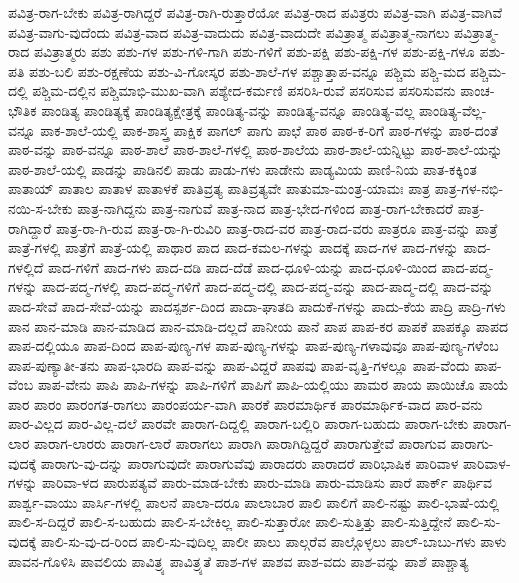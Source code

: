 {ಪವಿತ್ರ-ರಾಗ-ಬೇಕು
ಪವಿತ್ರ-ರಾಗಿದ್ದರೆ
ಪವಿತ್ರ-ರಾಗಿ-ರುತ್ತಾರೆಯೋ
ಪವಿತ್ರ-ರಾದ
ಪವಿತ್ರರು
ಪವಿತ್ರ-ವಾಗಿ
ಪವಿತ್ರ-ವಾಗಿವೆ
ಪವಿತ್ರ-ವಾಗು-ವುದೆಂದು
ಪವಿತ್ರ-ವಾದ
ಪವಿತ್ರ-ವಾದುದು
ಪವಿತ್ರ-ವಾದುದೇ
ಪವಿತ್ರಾತ್ಮ
ಪವಿತ್ರಾತ್ಮ-ನಾಗಲು
ಪವಿತ್ರಾತ್ಮ-ರಾದ
ಪವಿತ್ರಾತ್ಮರು
ಪಶು
ಪಶು-ಗಳ
ಪಶು-ಗಳಿ-ಗಾಗಿ
ಪಶು-ಗಳಿಗೆ
ಪಶು-ಪಕ್ಷಿ
ಪಶು-ಪಕ್ಷಿ-ಗಳ
ಪಶು-ಪಕ್ಷಿ-ಗಳೂ
ಪಶು-ಪತಿ
ಪಶು-ಬಲಿ
ಪಶು-ರಕ್ಷಣೆಯ
ಪಶು-ವಿ-ಗೋಸ್ಕರ
ಪಶು-ಶಾಲೆ-ಗಳ
ಪಶ್ಚಾತ್ತಾಪ-ವನ್ನೂ
ಪಶ್ಚಿಮ
ಪಶ್ಚಿ-ಮದ
ಪಶ್ಚಿಮ-ದಲ್ಲಿ
ಪಶ್ಚಿಮ-ದಲ್ಲಿನ
ಪಶ್ಚಿಮಾಭಿ-ಮುಖ-ವಾಗಿ
ಪಶ್ಯೇದ-ಕರ್ಮಣಿ
ಪಸರಿಸಿ-ರುವೆ
ಪಸರಿಸುವ
ಪಸರಿಸುವನು
ಪಾಂಚ-ಭೌತಿಕ
ಪಾಂಡಿತ್ಯ
ಪಾಂಡಿತ್ಯಕ್ಕೆ
ಪಾಂಡಿತ್ಯಕ್ಷೇತ್ರಕ್ಕೆ
ಪಾಂಡಿತ್ಯ-ವನ್ನು
ಪಾಂಡಿತ್ಯ-ವನ್ನೂ
ಪಾಂಡಿತ್ಯ-ವಲ್ಲ
ಪಾಂಡಿತ್ಯ-ವೆಲ್ಲ-ವನ್ನೂ
ಪಾಕ-ಶಾಲೆ-ಯಲ್ಲಿ
ಪಾಕ-ಶಾಸ್ತ್ರ
ಪಾಕ್ಷಿಕ
ಪಾಗಲ್
ಪಾಗು
ಪಾಛೆ
ಪಾಠ
ಪಾಠ-ಕ-ರಿಗೆ
ಪಾಠ-ಗಳನ್ನು
ಪಾಠ-ದಂತೆ
ಪಾಠ-ವನ್ನು
ಪಾಠ-ವನ್ನೂ
ಪಾಠ-ಶಾಲೆ
ಪಾಠ-ಶಾಲೆ-ಗಳಲ್ಲಿ
ಪಾಠ-ಶಾಲೆಯ
ಪಾಠ-ಶಾಲೆ-ಯನ್ನಿಟ್ಟು
ಪಾಠ-ಶಾಲೆ-ಯನ್ನು
ಪಾಠ-ಶಾಲೆ-ಯಲ್ಲಿ
ಪಾಡನ್ನು
ಪಾಡಿನಲಿ
ಪಾಡು
ಪಾಡು-ಗಳು
ಪಾಡೇನು
ಪಾಡ್ಯಮಿಯ
ಪಾಣಿ-ನಿಯ
ಪಾತ-ಕಕ್ಕಿಂತ
ಪಾತಾಯ್
ಪಾತಾಲ
ಪಾತಾಳ
ಪಾತಾಳಕೆ
ಪಾತಿವ್ರತ್ಯ
ಪಾತಿವ್ರತ್ಯವೇ
ಪಾತುಮಾ-ಮಂತ್ರ-ಯಾಮಃ
ಪಾತ್ರ
ಪಾತ್ರ-ಗಳ-ನಭಿ-ನಯಿ-ಸ-ಬೇಕು
ಪಾತ್ರ-ನಾಗಿದ್ದನು
ಪಾತ್ರ-ನಾಗುವೆ
ಪಾತ್ರ-ನಾದ
ಪಾತ್ರ-ಭೇದ-ಗಳಿಂದ
ಪಾತ್ರ-ರಾಗ-ಬೇಕಾದರೆ
ಪಾತ್ರ-ರಾಗಿದ್ದಾರೆ
ಪಾತ್ರ-ರಾ-ಗಿ-ರುವ
ಪಾತ್ರ-ರಾ-ಗಿ-ರುವಿರಿ
ಪಾತ್ರ-ರಾದ-ವರ
ಪಾತ್ರ-ರಾದ-ವರು
ಪಾತ್ರರೂ
ಪಾತ್ರ-ವನ್ನು
ಪಾತ್ರೆ
ಪಾತ್ರೆ-ಗಳಲ್ಲಿ
ಪಾತ್ರೆಗೆ
ಪಾತ್ರೆ-ಯಲ್ಲಿ
ಪಾಥಾರ
ಪಾದ
ಪಾದ-ಕಮಲ-ಗಳನ್ನು
ಪಾದಕ್ಕೆ
ಪಾದ-ಗಳ
ಪಾದ-ಗಳನ್ನು
ಪಾದ-ಗಳಲ್ಲಿದೆ
ಪಾದ-ಗಳಿಗೆ
ಪಾದ-ಗಳು
ಪಾದ-ದಡಿ
ಪಾದ-ದೆಡೆ
ಪಾದ-ಧೂಳಿ-ಯನ್ನು
ಪಾದ-ಧೂಳಿ-ಯಿಂದ
ಪಾದ-ಪದ್ಮ-ಗಳನ್ನು
ಪಾದ-ಪದ್ಮ-ಗಳಲ್ಲಿ
ಪಾದ-ಪದ್ಮ-ಗಳಿಗೆ
ಪಾದ-ಪದ್ಮ-ದಲ್ಲಿ
ಪಾದ-ಪದ್ಮ-ವನ್ನು
ಪಾದ-ಪಾದ್ಮ-ದಲ್ಲಿ
ಪಾದ-ವನ್ನು
ಪಾದ-ಸೇವೆ
ಪಾದ-ಸೇವೆ-ಯನ್ನು
ಪಾದಸ್ಪರ್ಶ-ದಿಂದ
ಪಾದಾ-ಘಾತದಿ
ಪಾದುಕೆ-ಗಳನ್ನು
ಪಾದು-ಕೆಯ
ಪಾದ್ರಿ
ಪಾದ್ರಿ-ಗಳು
ಪಾನ
ಪಾನ-ಮಾಡಿ
ಪಾನ-ಮಾಡಿದ
ಪಾನ-ಮಾಡಿ-ದಲ್ಲದೆ
ಪಾನೀಯ
ಪಾನೆ
ಪಾಪ
ಪಾಪ-ಕರ
ಪಾಪಕೆ
ಪಾಪಕ್ಕೂ
ಪಾಪದ
ಪಾಪ-ದಲ್ಲಿಯೂ
ಪಾಪ-ದಿಂದ
ಪಾಪ-ಪುಣ್ಯ-ಗಳ
ಪಾಪ-ಪುಣ್ಯ-ಗಳನ್ನು
ಪಾಪ-ಪುಣ್ಯ-ಗಳಾವುವೂ
ಪಾಪ-ಪುಣ್ಯ-ಗಳೆಂಬ
ಪಾಪ-ಪುಣ್ಯಾತೀ-ತನು
ಪಾಪ-ಭಾರದಿ
ಪಾಪ-ವನ್ನು
ಪಾಪ-ವಿದ್ದರೆ
ಪಾಪವು
ಪಾಪ-ವೃತ್ತಿ-ಗಳಲ್ಲೂ
ಪಾಪ-ವೆಂದು
ಪಾಪ-ವೆಂಬ
ಪಾಪ-ವೇನು
ಪಾಪಿ
ಪಾಪಿ-ಗಳನ್ನು
ಪಾಪಿ-ಗಳಿಗೆ
ಪಾಪಿಗೆ
ಪಾಪಿ-ಯಲ್ಲಿಯು
ಪಾಮರ
ಪಾಯ
ಪಾಯಿಚೊ
ಪಾಯೆ
ಪಾರ
ಪಾರಂ
ಪಾರಂಗತ-ರಾಗಲು
ಪಾರಂಪರ್ಯ-ವಾಗಿ
ಪಾರಕೆ
ಪಾರಮಾರ್ಥಿಕ
ಪಾರಮಾರ್ಥಿಕ-ವಾದ
ಪಾರ-ವನು
ಪಾರ-ವಿಲ್ಲದ
ಪಾರ-ವಿಲ್ಲ-ದಲೆ
ಪಾರವೇ
ಪಾರಾಗ-ದಿದ್ದಲ್ಲಿ
ಪಾರಾಗ-ಬಲ್ಲಿರಿ
ಪಾರಾಗ-ಬಹುದು
ಪಾರಾಗ-ಬೇಕು
ಪಾರಾಗ-ಲಾರ
ಪಾರಾಗ-ಲಾರರು
ಪಾರಾಗ-ಲಾರೆ
ಪಾರಾಗಲು
ಪಾರಾಗಿ
ಪಾರಾಗಿದ್ದಿದ್ದರೆ
ಪಾರಾಗುತ್ತೇವೆ
ಪಾರಾಗುವ
ಪಾರಾಗು-ವುದಕ್ಕೆ
ಪಾರಾಗು-ವು-ದನ್ನು
ಪಾರಾಗುವುದೇ
ಪಾರಾಗುವೆವು
ಪಾರಾದರು
ಪಾರಾದರೆ
ಪಾರಿಭಾಷಿಕ
ಪಾರಿವಾಳ
ಪಾರಿವಾಳ-ಗಳನ್ನು
ಪಾರಿವಾ-ಳದ
ಪಾರುಪತ್ಯವೆ
ಪಾರು-ಮಾಡ-ಬೇಕು
ಪಾರು-ಮಾಡಿ
ಪಾರು-ಮಾಡಿಸು
ಪಾರೆ
ಪಾರ್ಕ್
ಪಾರ್ಥಿವ
ಪಾರ್ಶ್ವ-ವಾಯು
ಪಾರ್ಸಿ-ಗಳಲ್ಲಿ
ಪಾಲನೆ
ಪಾಲಾ-ದರೂ
ಪಾಲಾಬಾರ
ಪಾಲಿ
ಪಾಲಿಗೆ
ಪಾಲಿ-ನಷ್ಟು
ಪಾಲಿ-ಭಾಷೆ-ಯಲ್ಲಿ
ಪಾಲಿ-ಸ-ದಿದ್ದರೆ
ಪಾಲಿ-ಸ-ಬಹುದು
ಪಾಲಿ-ಸ-ಬೇಕಿಲ್ಲ
ಪಾಲಿ-ಸುತ್ತಾರೋ
ಪಾಲಿ-ಸುತ್ತಿತ್ತು
ಪಾಲಿ-ಸುತ್ತಿದ್ದೇನೆ
ಪಾಲಿ-ಸು-ವುದಕ್ಕೆ
ಪಾಲಿ-ಸು-ವು-ದ-ರಿಂದ
ಪಾಲಿ-ಸು-ವುದಿಲ್ಲ
ಪಾಲೀ
ಪಾಲು
ಪಾಲ್ಗರೆವ
ಪಾಲ್ಗೊಳ್ಳಲು
ಪಾಲ್-ಬಾಬು-ಗಳು
ಪಾಳು
ಪಾವನ-ಗೊಳಿಸಿ
ಪಾವಲಿಯ
ಪಾವಿತ್ರ್ಯ
ಪಾವಿತ್ರ್ಯತೆ
ಪಾಶ-ಗಳ
ಪಾಶವ
ಪಾಶ-ವದು
ಪಾಶ-ವನ್ನು
ಪಾಶೆ
ಪಾಶ್ಚಾತ್ಯ
}
